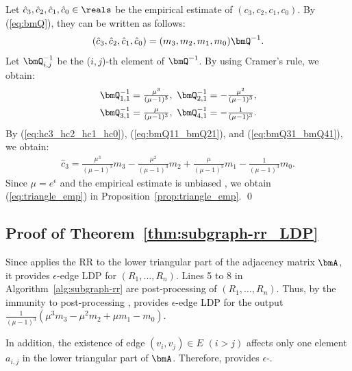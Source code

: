 Let $\hat{c}_3, \hat{c}_2, \hat{c}_1, \hat{c}_0 \in \reals$ be the empirical estimate of $(c_3, c_2, c_1, c_0)$. 
By (\ref{eq:bmQ}), they can be written as follows:
\begin{align}
(\hat{c}_3, \hat{c}_2, \hat{c}_1, \hat{c}_0) = (m_3, m_2, m_1, m_0) \bmQ^{-1}.
\label{eq:hc3_hc2_hc1_hc0}
\end{align}
Let $\bmQ_{i,j}^{-1}$ be the ($i,j$)-th element of $\bmQ^{-1}$. 
By using Cramer's rule, we obtain: 
\begin{align}
\bmQ_{1,1}^{-1} &= \textstyle{\frac{\mu^3}{(\mu-1)^3}},~ \bmQ_{2,1}^{-1} =  \textstyle{-\frac{\mu^2}{(\mu-1)^3}}, \label{eq:bmQ11_bmQ21}\\
\bmQ_{3,1}^{-1} &= \textstyle{\frac{\mu}{(\mu-1)^3}},~ \bmQ_{4,1}^{-1} = \textstyle{-\frac{1}{(\mu-1)^3}}.
\label{eq:bmQ31_bmQ41}
\end{align}
By (\ref{eq:hc3_hc2_hc1_hc0}), (\ref{eq:bmQ11_bmQ21}), and (\ref{eq:bmQ31_bmQ41}), we obtain:
\begin{align*}
\textstyle{\hat{c}_3 = \frac{\mu^3}{(\mu-1)^3} m_3 - \frac{\mu^2}{(\mu-1)^3} m_2 + \frac{\mu}{(\mu-1)^3} m_1 - \frac{1}{(\mu-1)^3} m_0.}
\end{align*}
Since $\mu = e^\epsilon$ and the empirical estimate is unbiased \cite{Kairouz_ICML16,Wang_USENIX17}, we obtain (\ref{eq:triangle_emp}) in Proposition~\ref{prop:triangle_emp}. \qed

\subsection{Proof of Theorem~\ref{thm:subgraph-rr_LDP}}
Since  applies the RR to the lower triangular part of the adjacency matrix $\bmA$, it provides $\epsilon$-edge LDP for $(R_1, \ldots, R_n)$. 
Lines 5 to 8 in Algorithm~\ref{alg:subgraph-rr} are post-processing of $(R_1, \ldots, R_n)$. 
Thus, by the immunity to post-processing \cite{DP},  provides $\epsilon$-edge LDP for the output $\frac{1}{(\mu-1)^3}(\mu^3 m_3 -\mu^2 m_2 + \mu m_1 - m_0)$. 

In addition, the existence of edge $(v_i,v_j) \in E$ $(i>j)$ affects only one element $a_{i,j}$ in the lower triangular part of $\bmA$. 
Therefore,  provides $\epsilon$-.

